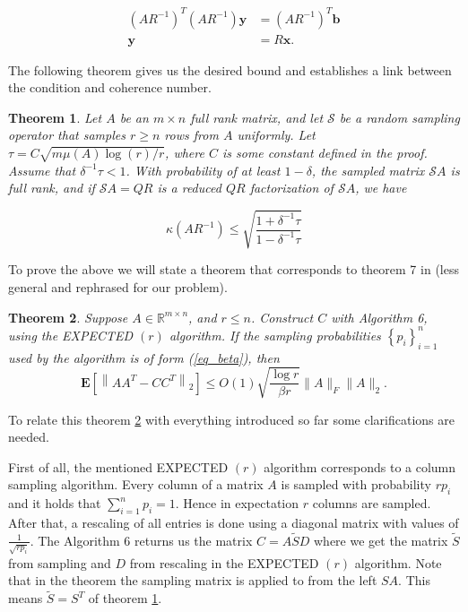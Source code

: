 \documentclass{article}
\newtheorem{theorem}{Theorem}
\begin{document}
\begin{equation} \label{equ_prec}
	\begin{aligned}
		(AR^{-1})^T (AR^{-1}) \mathbf{y} &= (AR^{-1})^T \mathbf{b} \\
		\mathbf{y} &= R \mathbf{x}.
	\end{aligned}
\end{equation}

The following theorem gives us the desired bound and establishes a link between the
condition and coherence number. 

\begin{theorem} \label{thm_1}
Let $A$ be an $m \times n$ full rank matrix, and let $\mathcal{S}$ be a random
sampling operator that samples $r \geq n$ rows from $A$ uniformly. Let $\tau=C
\sqrt{m \mu(A) \log (r) / r}$, where $C$ is some constant defined in the proof.
Assume that $\delta^{-1} \tau<1$. With probability of at least $1-\delta$, the
sampled matrix $\mathcal{S} A$ is full rank, and if $\mathcal{S} A=Q R$ is a
reduced $Q R$ factorization of $\mathcal{S} A$, we have

\begin{equation} \label{equ_thm1}
	\kappa\left(A R^{-1}\right)
	\leq \sqrt{\frac{1+\delta^{-1} \tau}{1-\delta^{-1} \tau}}
\end{equation}
\end{theorem}

To prove the above we will state a theorem that corresponds to theorem 7 in
\cite{randalg} (less general and rephrased for our problem).

\begin{theorem} \label{thm_2}
Suppose $A \in \mathbb{R}^{m \times n}$, and $r
\leq n$. Construct $C$ with Algorithm 6, using the EXPECTED $(r)$
algorithm. If the sampling probabilities $\left\{p_{i}\right\}_{i=1}^{n}$ used
by the algorithm is of form (\ref{eq_beta}), then
$$
\mathbf{E}\left[\left\|A A^{T}-C C^{T}\right\|_{2}\right] \leq
O(1) \sqrt{\frac{\log r}{\beta r}}\|A\|_{F}\|A\|_{2} .
$$
\end{theorem}

To relate this theorem \ref{thm_2} with everything introduced so far some
clarifications are needed.

\smallskip

First of all, the mentioned EXPECTED $(r)$ algorithm corresponds to a column
sampling algorithm. Every column of a matrix $A$ is sampled with probability $r
p_i$ and it holds that $\sum_{i=1}^{n} p_i = 1$. Hence in expectation $r$
columns are sampled. After that, a rescaling of all entries is done using a
diagonal matrix with values of $\frac{1}{\sqrt{r p_i}}$. The Algorithm 6
returns us the matrix $C=A\tilde{S}D$ where we get the matrix $\tilde{S}$ from sampling
and $D$ from rescaling in the EXPECTED $(r)$ algorithm. Note that in the
theorem the sampling matrix is applied to from the left $SA$. This means $\tilde{S}=S^T$ of
theorem \ref{thm_1}.
\end{document}
